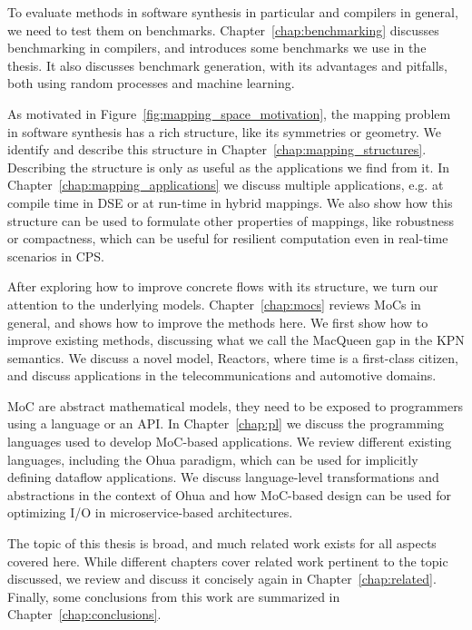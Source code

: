 To evaluate methods in software synthesis in particular and compilers in general, we need to test them on benchmarks. 
Chapter~\ref{chap:benchmarking} discusses benchmarking in compilers, and introduces some benchmarks we use in the thesis.
It also discusses benchmark generation, with its advantages and pitfalls, both using random processes and machine learning.

As motivated in Figure~\ref{fig:mapping_space_motivation}, the mapping problem in software synthesis has a rich structure, like its symmetries or geometry.
We identify and describe this structure in Chapter~\ref{chap:mapping_structures}.
Describing the structure is only as useful as the applications we find from it.
In Chapter~\ref{chap:mapping_applications} we discuss multiple applications, e.g. at compile time in \ac{DSE} or at run-time in hybrid mappings.
We also show how this structure can be used to formulate other properties of mappings, like robustness or compactness, which can be useful for resilient computation even in real-time scenarios in \ac{CPS}.

After exploring how to improve concrete flows with its structure, we turn our attention to the underlying models.
Chapter~\ref{chap:mocs} reviews \acfp{MoC} in general, and shows how to improve the methods here.
We first show how to improve existing methods, discussing what we call the MacQueen gap in the \ac{KPN} semantics.
We discuss a novel model, Reactors, where time is a first-class citizen, and discuss applications in the telecommunications and automotive domains.

\ac{MoC} are abstract mathematical models, they need to be exposed to programmers using a language or an \acs{API}.
In Chapter~\ref{chap:pl} we discuss the programming languages used to develop \ac{MoC}-based applications. 
We review different existing languages, including the Ohua paradigm, which can be used for implicitly defining dataflow applications.
We discuss language-level transformations and abstractions in the context of Ohua and how \ac{MoC}-based design can be used for optimizing \acs{I/O} in microservice-based architectures.

The topic of this thesis is broad, and much related work exists for all aspects covered here. 
While different chapters cover related work pertinent to the topic discussed, we review and discuss it concisely again in Chapter~\ref{chap:related}.
Finally, some conclusions from this work are summarized in Chapter~\ref{chap:conclusions}.

